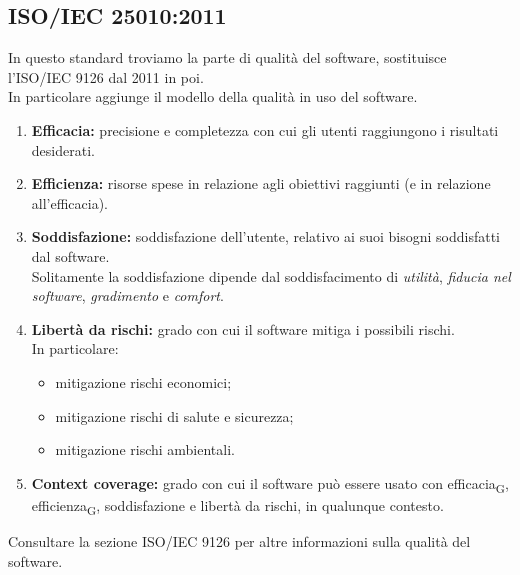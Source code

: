 \subsection{ISO/IEC 25010:2011}
In questo standard troviamo la parte di qualità del software, sostituisce l'ISO/IEC 9126 dal 2011 in poi.\\
In particolare aggiunge il modello della qualità in uso del software.\\
\begin{enumerate}
	\item \textbf{Efficacia:} precisione e completezza con cui gli utenti raggiungono i risultati desiderati.
	\item \textbf{Efficienza:} risorse spese in relazione agli obiettivi raggiunti (e in relazione all'efficacia).
	\item \textbf{Soddisfazione:} soddisfazione dell'utente, relativo ai suoi bisogni soddisfatti dal software.\\Solitamente la soddisfazione dipende dal soddisfacimento di \textit{utilità}, \textit{fiducia nel software}, \textit{gradimento} e \textit{comfort}.
	\item \textbf{Libertà da rischi:} grado con cui il software mitiga i possibili rischi.\\In particolare:
		\begin{itemize}
			\item mitigazione rischi economici;
			\item mitigazione rischi di salute e sicurezza;
			\item mitigazione rischi ambientali.
		\end{itemize}
	\item \textbf{Context coverage:} grado con cui il software può essere usato con efficacia\textsubscript{G}, efficienza\textsubscript{G}, soddisfazione e libertà da rischi, in qualunque contesto.
\end{enumerate}
Consultare la sezione ISO/IEC 9126 per altre informazioni sulla qualità del software.
